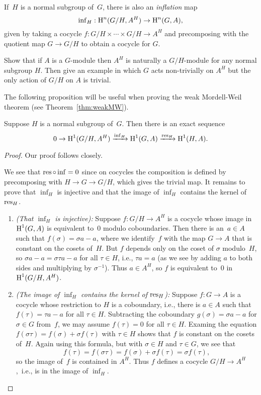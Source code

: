 If~$H$ is a normal subgroup of~$G$, there is also an \emph{inflation} map
$$
	\operatorname{inf}_H: \operatorname{H}^n(G/H, A^H) \to \operatorname{H}^n(G,A),
$$
given by taking a cocycle $f : G/H \times \cdots \times G/H \to A^H$
and precomposing with the quotient map $G\to G/H$ to
obtain a cocycle for $G$.

\begin{exercise}
	Show that if $A$ is a $G$-module then
	$A^H$ is naturally a $G/H$-module for
	any normal subgroup $H$.
	Then give an example in which $G$ acts non-trivially on $A^H$
	but the only action of $G/H$ on $A$ is trivial.
\end{exercise}

The following proposition will be useful when proving
the weak Mordell-Weil theorem (see Theorem~\ref{thm:weakMW}).
\begin{proposition}\label{prop:infres}
	Suppose $H$ is a normal subgroup of~$G$.
	Then there is an exact sequence
	$$
		0 \to \operatorname{H}^1(G/H, A^H)\xrightarrow{\operatorname{inf}_H}  \operatorname{H}^1(G,A)\xrightarrow{\operatorname{res}_H} \operatorname{H}^1(H,A).
	$$
\end{proposition}
\begin{proof}
Our proof follows \cite[pg.~117]{serre:localfields} closely.

We see that $\operatorname{res}\circ \operatorname{inf} = 0$ since on cocycles the composition is
defined by precomposing with $H\to G\to G/H$, which gives the trivial map.
It remains to prove that $\inf_H$ is injective and that the image of $\inf_H$
contains the kernel of $\operatorname{res}_H$.
\begin{enumerate}
\item {\em (That $\inf_H$ is injective):}
	Suppose $f:G/H\to A^H$ is a cocycle whose image in $\operatorname{H}^1(G,A)$
	is equivalent to~$0$ modulo coboundaries. Then there is an~$a\in A$
	such that $f(\sigma) = \sigma a - a$, where we identify~$f$ with
	the map $G\to A$ that is constant on the cosets of~$H$. But $f$
	depends only on the coset of $\sigma$ modulo~$H$, so
	$\sigma a - a = \sigma \tau a - a$ for all $\tau \in H$, i.e.,
	$\tau a = a$ (as we see by adding $a$ to both sides and multiplying
	by $\sigma^{-1}$). Thus $a\in A^H$, so $f$ is equivalent to~$0$ in
	$\operatorname{H}^1(G/H,A^H)$.

\item {\em (The image of $\inf_H$ contains the kernel of $\operatorname{res}_H$):}
	Suppose $f:G\to A$ is a cocycle whose
	restriction to $H$ is a coboundary, i.e., there is $a\in A$ such
	that $f(\tau) = \tau a - a$ for all $\tau \in H$.
	Subtracting the coboundary $g(\sigma) = \sigma a - a$ for $\sigma\in G$
	from~$f$, we may assume $f(\tau) = 0$ for all $\tau \in H$.
	Examing the equation $f(\sigma\tau) = f(\sigma) + \sigma f(\tau)$
	with $\tau\in H$ shows that $f$ is constant on the cosets of~$H$.
	Again using this formula, but with $\sigma\in H$ and $\tau\in G$, we see
	that
	$$
	  f(\tau) = f(\sigma \tau) = f(\sigma) + \sigma f(\tau) = \sigma f(\tau),
	$$
	so the image of~$f$ is contained in $A^H$.  Thus $f$ defines a cocycle
	$G/H \to A^H$,~i.e., is in the image of $\inf_H$.
\end{enumerate}
\end{proof}

